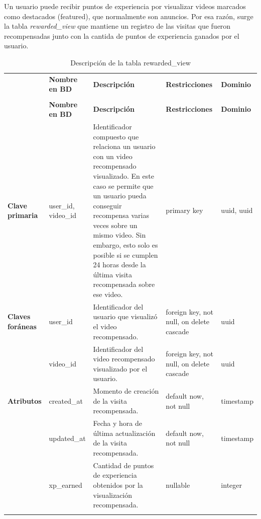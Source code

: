 
Un usuario puede recibir puntos de experiencia por visualizar videos marcados como destacados (featured), que normalmente son anuncios. Por esa razón, surge la tabla \textit{rewarded\_view} que mantiene un registro de las visitas que fueron recompensadas junto con la cantida de puntos de experiencia ganados por el usuario. 

\renewcommand{\arraystretch}{1.35}
\setlength{\tabcolsep}{3pt}
\small

\begin{longtable}{|
>{\raggedright\arraybackslash}p{1.9cm}|
>{\raggedright\arraybackslash}p{2.7cm}|
>{\raggedright\arraybackslash}p{4.9cm}|
>{\raggedright\arraybackslash}p{2.7cm}|
>{\raggedright\arraybackslash}p{2.1cm}|
}
\hline

\rowcolor[gray]{0.75}
\multicolumn{5}{|c|}{\textbf{Visualizaciones recompensadas}} \\
\hline

 & \textbf{Nombre en BD} & \textbf{Descripción} & \textbf{Restricciones} & \textbf{Dominio} \\
\hline
\endfirsthead

\hline
\rowcolor[gray]{0.75}
\multicolumn{5}{|c|}{\textbf{Visualizaciones recompensadas}} \\
\hline

 & \textbf{Nombre en BD} & \textbf{Descripción} & \textbf{Restricciones} & \textbf{Dominio} \\
\hline
\endhead

\textbf{Clave primaria}
& user\_\allowbreak id, video\_\allowbreak id
& Identificador compuesto que relaciona un usuario con un video recompensado visualizado. En este caso se permite que un usuario pueda conseguir recompensa varias veces sobre un mismo video. Sin embargo, esto solo es posible si se cumplen 24 horas desde la última visita recompensada sobre ese video. 
& primary key
& uuid, uuid \\
\hline

\textbf{Claves foráneas}
& user\_\allowbreak id
& Identificador del usuario que visualizó el video recompensado.
& foreign key, not null, on delete cascade
& uuid \\
\cline{2-5}

& video\_\allowbreak id
& Identificador del video recompensado visualizado por el usuario.
& foreign key, not null, on delete cascade
& uuid \\
\hline

\textbf{Atributos}
& created\_\allowbreak at
& Momento de creación de la visita recompensada.
& default now, not null
& timestamp \\
\cline{2-5}

& updated\_\allowbreak at
& Fecha y hora de última actualización de la visita recompensada.
& default now, not null
& timestamp \\
\cline{2-5}

& xp\_\allowbreak earned
& Cantidad de puntos de experiencia obtenidos por la visualización recompensada.
& nullable
& integer \\
\hline

\caption{Descripción de la tabla rewarded\_view}
\end{longtable}


